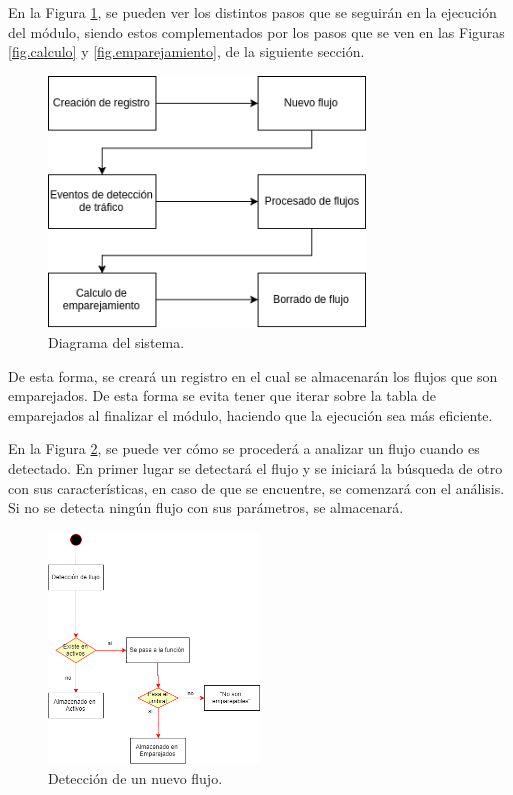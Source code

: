 \intro En la Figura \ref{fig.digsistema}, se pueden ver los distintos pasos que se seguirán en la ejecución del módulo, siendo estos 
complementados por los pasos que se ven en las Figuras \ref{fig.calculo} y \ref{fig.emparejamiento}, de la siguiente sección.

\begin{figure}[H]
  \includegraphics[width=0.75\textwidth]{imagenes/DiagramaSistema.png}
  \centering
  \caption{Diagrama del sistema.}\label{fig.digsistema}
\end{figure}

\intro De esta forma, se creará un registro en el cual se almacenarán los flujos que son emparejados. De esta forma se evita tener 
que iterar sobre la tabla de emparejados al finalizar el módulo, haciendo que la ejecución sea más eficiente.

\intro En la Figura \ref{fig.nacimiento}, se puede ver cómo se procederá a analizar un flujo cuando es detectado. En primer lugar se 
detectará el flujo y se iniciará la búsqueda de otro con sus características, en caso de que se encuentre, se comenzará con el 
análisis. Si no se detecta ningún flujo con sus parámetros, se almacenará.

\begin{figure}[H]
  \includegraphics[width=0.5\textwidth]{imagenes/nacimiento.png}
  \centering
  \caption{Detección de un nuevo flujo.}\label{fig.nacimiento}
\end{figure}

